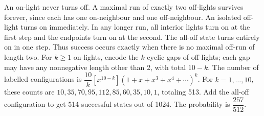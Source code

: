 An on-light never turns off. A maximal run of exactly two off-lights survives forever, since each has one on-neighbour and one off-neighbour. An isolated off-light turns on immediately. In any longer run, all interior lights turn on at the first step and the endpoints turn on at the second. The all-off state turns entirely on in one step. Thus success occurs exactly when there is no maximal off-run of length two. For $k\ge1$ on-lights, encode the $k$ cyclic gaps of off-lights; each gap may have any nonnegative length other than 2, with total $10-k$. The number of labelled configurations is $\dfrac{10}{k}[x^{10-k}](1+x+x^3+x^4+\cdots)^k$. For $k=1,\ldots,10$, these counts are $10,35,70,95,112,85,60,35,10,1$, totaling 513. Add the all-off configuration to get 514 successful states out of 1024. The probability is $\boxed{\dfrac{257}{512}}$.
